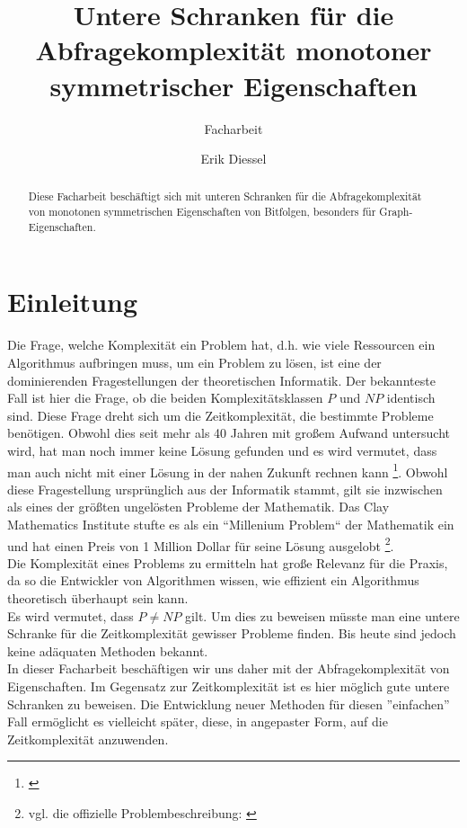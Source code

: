 \documentclass[a4paper]{scrreprt}
\title{Untere Schranken für die Abfragekomplexität 
       monotoner symmetrischer Eigenschaften}
\subtitle{Facharbeit}
\author{Erik Diessel}
\theoremstyle{definition}
\begin{document}
\maketitle

\begin{abstract}
Diese Facharbeit beschäftigt sich mit unteren Schranken
für die Abfragekomplexität von monotonen symmetrischen
Eigenschaften von Bitfolgen, besonders für Graph-Eigenschaften.
\end{abstract}

\tableofcontents

\chapter{Einleitung}
Die Frage, welche Komplexität ein Problem hat, d.h.
wie viele Ressourcen ein Algorithmus aufbringen muss,
um ein Problem zu lösen, ist eine der dominierenden
Fragestellungen der theoretischen Informatik.
Der bekannteste Fall ist hier die Frage, ob die beiden
Komplexitätsklassen $P$ und $NP$ identisch sind. Diese
Frage dreht sich um die Zeitkomplexität, die bestimmte
Probleme benötigen. Obwohl dies seit mehr als 40 Jahren
mit großem Aufwand untersucht wird, hat man noch
immer keine Lösung gefunden und es wird vermutet, dass
man auch nicht mit einer Lösung in der nahen Zukunft
rechnen kann \footnote{\cite{PvsNP}}.
Obwohl diese Fragestellung ursprünglich aus der
Informatik stammt, gilt sie inzwischen als eines der
größten ungelösten Probleme der Mathematik. Das Clay
Mathematics Institute stufte es als ein ``Millenium Problem``
der Mathematik ein und hat einen Preis von
1 Million Dollar für seine Lösung ausgelobt
\footnote{vgl. die offizielle Problembeschreibung:
\cite{PvsNPOfficial}}. \\
Die Komplexität eines Problems zu ermitteln hat
große Relevanz für die Praxis, da so die Entwickler
von Algorithmen wissen, wie effizient ein Algorithmus
theoretisch überhaupt sein kann. \\
Es wird vermutet, dass $P\neq NP$ gilt. Um dies zu beweisen
müsste man eine untere Schranke für die Zeitkomplexität
gewisser Probleme finden. Bis heute sind jedoch
keine adäquaten Methoden bekannt. \\
In dieser Facharbeit beschäftigen wir uns daher mit
der  Abfragekomplexität von Eigenschaften. Im Gegensatz
zur Zeitkomplexität ist es hier möglich gute
untere Schranken zu beweisen. Die Entwicklung
neuer Methoden für diesen ''einfachen'' Fall ermöglicht
es vielleicht später, diese, in angepaster Form, auf
die Zeitkomplexität anzuwenden.\\
\end{document}
